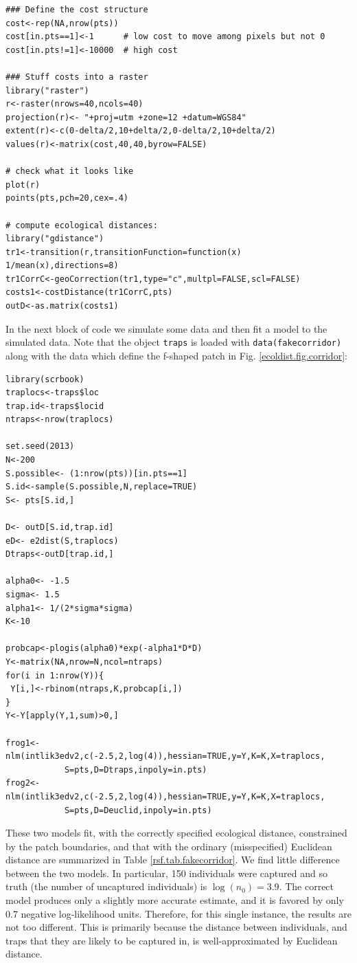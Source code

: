 {\small
\begin{verbatim}
### Define the cost structure
cost<-rep(NA,nrow(pts))
cost[in.pts==1]<-1      # low cost to move among pixels but not 0
cost[in.pts!=1]<-10000  # high cost

### Stuff costs into a raster
library("raster")
r<-raster(nrows=40,ncols=40)
projection(r)<- "+proj=utm +zone=12 +datum=WGS84"
extent(r)<-c(0-delta/2,10+delta/2,0-delta/2,10+delta/2)
values(r)<-matrix(cost,40,40,byrow=FALSE)

# check what it looks like
plot(r)
points(pts,pch=20,cex=.4)

# compute ecological distances:
library("gdistance")
tr1<-transition(r,transitionFunction=function(x) 1/mean(x),directions=8)
tr1CorrC<-geoCorrection(tr1,type="c",multpl=FALSE,scl=FALSE)
costs1<-costDistance(tr1CorrC,pts)
outD<-as.matrix(costs1)
\end{verbatim}
}

In the next block of code we simulate some data and then fit a model
to the simulated data.  Note that the object \mbox{\tt traps} is
loaded with \mbox{\tt data(fakecorridor)} along with the data which
define the f-shaped patch in
Fig. \ref{ecoldist.fig.corridor}:
{\small
\begin{verbatim}
library(scrbook)
traplocs<-traps$loc
trap.id<-traps$locid
ntraps<-nrow(traplocs)

set.seed(2013)
N<-200
S.possible<- (1:nrow(pts))[in.pts==1]
S.id<-sample(S.possible,N,replace=TRUE)
S<- pts[S.id,]

D<- outD[S.id,trap.id]
eD<- e2dist(S,traplocs)
Dtraps<-outD[trap.id,]

alpha0<- -1.5
sigma<- 1.5
alpha1<- 1/(2*sigma*sigma)
K<-10

probcap<-plogis(alpha0)*exp(-alpha1*D*D)
Y<-matrix(NA,nrow=N,ncol=ntraps)
for(i in 1:nrow(Y)){
 Y[i,]<-rbinom(ntraps,K,probcap[i,])
}
Y<-Y[apply(Y,1,sum)>0,]

frog1<-nlm(intlik3edv2,c(-2.5,2,log(4)),hessian=TRUE,y=Y,K=K,X=traplocs,
            S=pts,D=Dtraps,inpoly=in.pts)
frog2<-nlm(intlik3edv2,c(-2.5,2,log(4)),hessian=TRUE,y=Y,K=K,X=traplocs,
            S=pts,D=Deuclid,inpoly=in.pts)
\end{verbatim}
}

These two models fit, with the correctly specified ecological
distance, constrained by the patch boundaries, and that with the
ordinary (misspecified) Euclidean distance are summarized in Table \ref{rsf.tab.fakecorridor}.
We find little difference between the two models. In
particular, 150 individuals were captured and so truth (the number of
uncaptured individuals) is $\log(n_{0}) = 3.9$.
The correct model produces only a slightly more accurate  estimate, and
it is favored by only 0.7 negative log-likelihood units.
Therefore, for this single instance, the results are not too different.
This is primarily because
 the distance between individuals, and traps that they are likely
to be captured in, is well-approximated by %
Euclidean distance.


